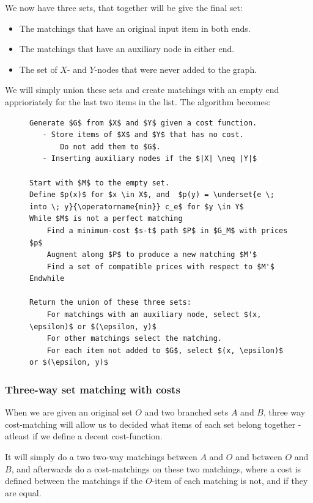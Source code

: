 \documentclass[11pt]{article}
\begin{document}
\endgroup

We now have three sets, that together will be give the final set:
\begin{itemize}
   \item The matchings that have an original input item in both ends.
   \item The matchings that have an auxiliary node in either end.
   \item The set of $X$- and $Y$-nodes that were never added to the graph.
\end{itemize}

We will simply union these sets and create matchings with an empty end apprioriately for the last two items in the list. The algorithm becomes:

\begin{figure}
\begin{lstlisting}[mathescape]
Generate $G$ from $X$ and $Y$ given a cost function.
   - Store items of $X$ and $Y$ that has no cost.
       Do not add them to $G$.
   - Inserting auxiliary nodes if the $|X| \neq |Y|$
       
Start with $M$ to the empty set.
Define $p(x)$ for $x \in X$, and  $p(y) = \underset{e \; into \; y}{\operatorname{min}} c_e$ for $y \in Y$
While $M$ is not a perfect matching
    Find a minimum-cost $s-t$ path $P$ in $G_M$ with prices $p$
    Augment along $P$ to produce a new matching $M'$
    Find a set of compatible prices with respect to $M'$
Endwhile

Return the union of these three sets:
    For matchings with an auxiliary node, select $(x, \epsilon)$ or $(\epsilon, y)$
    For other matchings select the matching.
    For each item not added to $G$, select $(x, \epsilon)$ or $(\epsilon, y)$

\end{lstlisting}
\end{figure}

\subsubsection{Three-way set matching with costs}
When we are given an original set $O$ and two branched sets $A$ and $B$, three way cost-matching will allow us to decided what items of each set belong together - atleast if we define a decent cost-function. 

It will simply do a two two-way matchings between $A$ and $O$ and between $O$ and $B$, and afterwards do a cost-matchings on these two matchings, where a cost is defined between the matchings if the $O$-item of each matching is not, and if they are equal. 
\end{document}
